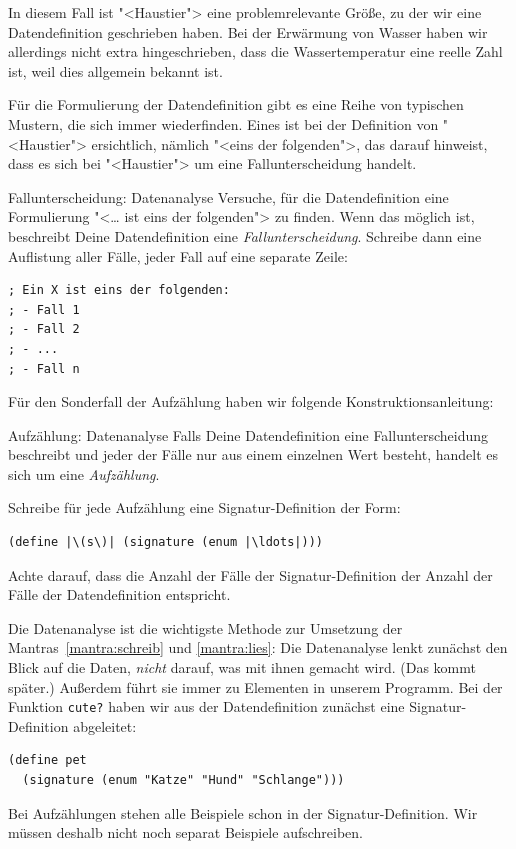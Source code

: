 In diesem Fall ist "<Haustier"> eine problemrelevante Größe, zu der
wir eine Datendefinition geschrieben haben.  Bei der Erwärmung von
Wasser haben wir allerdings nicht extra hingeschrieben, dass die
Wassertemperatur eine reelle Zahl ist, weil dies allgemein bekannt
ist.

Für die Formulierung der Datendefinition gibt es eine Reihe von
typischen Mustern, die sich immer wiederfinden.  Eines ist bei der
Definition von "<Haustier"> ersichtlich, nämlich "<eins der
folgenden">, das darauf hinweist, dass es sich bei "<Haustier"> um
eine Fallunterscheidung handelt.  

\begin{konstruktionsanleitung}{Fallunterscheidung: Datenanalyse}
  \label{ka:fallunterscheidung}
  Versuche, für die Datendefinition eine Formulierung "<\ldots{}
    ist eins der folgenden"> zu finden. Wenn das möglich ist, beschreibt
  Deine Datendefinition eine
  \textit{Fallunterscheidung}.  Schreibe
  dann eine Auflistung aller Fälle, jeder Fall auf eine separate
  Zeile:
  
\begin{lstlisting}
; Ein X ist eins der folgenden:
; - Fall 1
; - Fall 2
; - ...
; - Fall n
\end{lstlisting}
\end{konstruktionsanleitung}
%
Für den Sonderfall der Aufzählung haben wir folgende Konstruktionsanleitung:
%
\begin{konstruktionsanleitung}{Aufzählung: Datenanalyse}
  \label{ka:aufzaehlung}
  Falls Deine Datendefinition eine Fallunterscheidung beschreibt und
  jeder der Fälle nur aus einem einzelnen Wert besteht, handelt es
  sich um eine \textit{Aufzählung}.

  Schreibe für jede Aufzählung eine Signatur-Definition der Form:
\begin{lstlisting}
(define |\(s\)| (signature (enum |\ldots|)))
\end{lstlisting}
  Achte darauf, dass die Anzahl der Fälle der Signatur-Definition der
  Anzahl der Fälle der Datendefinition entspricht.
\end{konstruktionsanleitung}
%
Die Datenanalyse ist die wichtigste Methode zur Umsetzung der
Mantras~\ref{mantra:schreib} und \ref{mantra:lies}:
%
\mantraschreib*
%
\mantralies*
%
\noindent Die Datenanalyse lenkt zunächst den Blick auf die
Daten, \emph{nicht} darauf, was mit ihnen gemacht wird.  (Das
kommt später.)  Außerdem führt sie immer zu Elementen in unserem Programm.
Bei der Funktion \lstinline{cute?} haben wir aus der
Datendefinition zunächst eine Signatur-Definition abgeleitet:
%
\begin{lstlisting}
(define pet
  (signature (enum "Katze" "Hund" "Schlange")))
\end{lstlisting}
%
Bei Aufzählungen stehen alle Beispiele schon in der
Signatur-Definition.  Wir müssen deshalb nicht noch separat
Beispiele aufschreiben.

